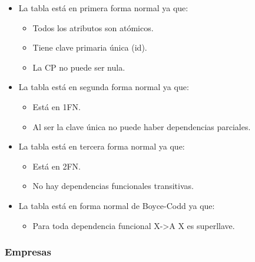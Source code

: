 \documentclass[12pt,a4paperpaper,]{report}
\providecommand{\tightlist}{%
  \setlength{\itemsep}{0pt}\setlength{\parskip}{0pt}}
\begin{document}
\begin{itemize}
\tightlist
\item
  La tabla está en primera forma normal ya que:

  \begin{itemize}
  \tightlist
  \item
    Todos los atributos son atómicos.
  \item
    Tiene clave primaria única (id).
  \item
    La CP no puede ser nula.
  \end{itemize}
\item
  La tabla está en segunda forma normal ya que:

  \begin{itemize}
  \tightlist
  \item
    Está en 1FN.
  \item
    Al ser la clave única no puede haber dependencias parciales.
  \end{itemize}
\item
  La tabla está en tercera forma normal ya que:

  \begin{itemize}
  \tightlist
  \item
    Está en 2FN.
  \item
    No hay dependencias funcionales transitivas.
  \end{itemize}
\item
  La tabla está en forma normal de Boyce-Codd ya que:

  \begin{itemize}
  \tightlist
  \item
    Para toda dependencia funcional X-\textgreater{}A X es superllave.
  \end{itemize}
\end{itemize}

\subsubsection{Empresas}\label{empresas-1}
\end{document}
